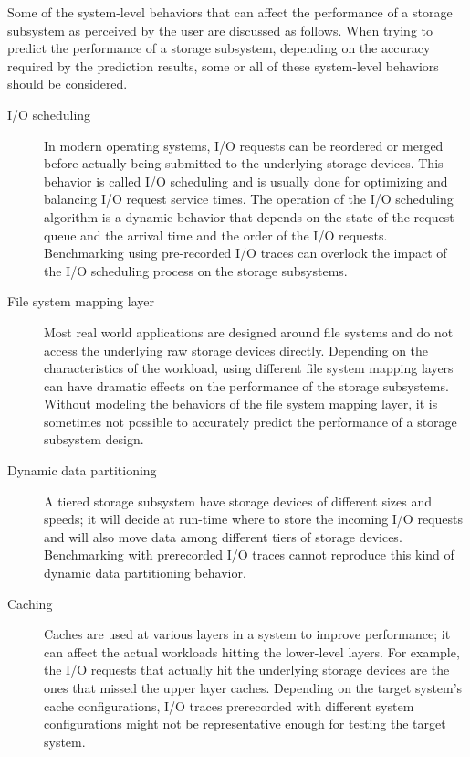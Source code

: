 Some of the system-level behaviors that can affect the performance of a storage subsystem as perceived by the user are discussed as follows. When trying to predict the performance of a storage subsystem, depending on the accuracy required by the prediction results, some or all of these system-level behaviors should be considered.

\begin{description}
	\item[I/O scheduling] In modern operating systems, I/O requests can be reordered or merged before actually being submitted to the underlying storage devices. This behavior is called I/O scheduling and is usually done for optimizing and balancing I/O request service times. The operation of the I/O scheduling algorithm is a dynamic behavior that depends on the state of the request queue and the arrival time and the order of the I/O requests. Benchmarking using pre-recorded I/O traces can overlook the impact of the I/O scheduling process on the storage subsystems.
	
	\item[File system mapping layer] Most real world applications are designed around file systems and do not access the underlying raw storage devices directly. Depending on the characteristics of the workload, using different file system mapping layers can have dramatic effects on the performance of the storage subsystems. Without modeling the behaviors of the file system mapping layer, it is sometimes not possible to accurately predict the performance of a storage subsystem design.
	
	\item[Dynamic data partitioning] A tiered storage subsystem have storage devices of different sizes and speeds; it will decide at run-time where to store the incoming I/O requests and will also move data among different tiers of storage devices. Benchmarking with prerecorded I/O traces cannot reproduce this kind of dynamic data partitioning behavior.
	
	\item[Caching] Caches are used at various layers in a system to improve performance; it can affect the actual workloads hitting the lower-level layers. For example, the I/O requests that actually hit the underlying storage devices are the ones that missed the upper layer caches. Depending on the target system’s cache configurations, I/O traces prerecorded with different system configurations might not be representative enough for testing the target system.
	

\end{description}
